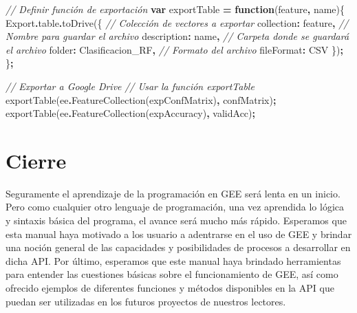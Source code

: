\documentclass[
  12pt,
  letterpaper,
  twoside]{book}
\newenvironment{Shaded}{\begin{snugshade}}{\end{snugshade}}
\newcommand{\AttributeTok}[1]{\textcolor[rgb]{0.77,0.63,0.00}{#1}}
\newcommand{\CommentTok}[1]{\textcolor[rgb]{0.56,0.35,0.01}{\textit{#1}}}
\newcommand{\DataTypeTok}[1]{\textcolor[rgb]{0.13,0.29,0.53}{#1}}
\newcommand{\FunctionTok}[1]{\textcolor[rgb]{0.00,0.00,0.00}{#1}}
\newcommand{\KeywordTok}[1]{\textcolor[rgb]{0.13,0.29,0.53}{\textbf{#1}}}
\newcommand{\NormalTok}[1]{#1}
\newcommand{\OperatorTok}[1]{\textcolor[rgb]{0.81,0.36,0.00}{\textbf{#1}}}
\newcommand{\StringTok}[1]{\textcolor[rgb]{0.31,0.60,0.02}{#1}}
\begin{document}
\begin{Shaded}
\begin{Highlighting}[]
\CommentTok{// Definir función de exportación}
\KeywordTok{var}\NormalTok{ exportTable }\OperatorTok{=} \KeywordTok{function}\NormalTok{(feature}\OperatorTok{,}\NormalTok{ name)\{}
\NormalTok{  Export}\OperatorTok{.}\AttributeTok{table}\OperatorTok{.}\FunctionTok{toDrive}\NormalTok{(\{}
    \CommentTok{// Colección de vectores a exportar}
    \DataTypeTok{collection}\OperatorTok{:}\NormalTok{ feature}\OperatorTok{,}
    \CommentTok{// Nombre para guardar el archivo}
    \DataTypeTok{description}\OperatorTok{:}\NormalTok{ name}\OperatorTok{,}
    \CommentTok{// Carpeta donde se guardará el archivo}
    \DataTypeTok{folder}\OperatorTok{:} \StringTok{\textquotesingle{}Clasificacion\_RF\textquotesingle{}}\OperatorTok{,}
    \CommentTok{// Formato del archivo}
    \DataTypeTok{fileFormat}\OperatorTok{:} \StringTok{\textquotesingle{}CSV\textquotesingle{}}
\NormalTok{ \})}\OperatorTok{;}
\NormalTok{\}}\OperatorTok{;}

\CommentTok{// Exportar a Google Drive}
\CommentTok{// Usar la función exportTable}
\FunctionTok{exportTable}\NormalTok{(ee}\OperatorTok{.}\FunctionTok{FeatureCollection}\NormalTok{(expConfMatrix)}\OperatorTok{,} \StringTok{\textquotesingle{}confMatrix\textquotesingle{}}\NormalTok{)}\OperatorTok{;}
\FunctionTok{exportTable}\NormalTok{(ee}\OperatorTok{.}\FunctionTok{FeatureCollection}\NormalTok{(expAccuracy)}\OperatorTok{,} \StringTok{\textquotesingle{}validAcc\textquotesingle{}}\NormalTok{)}\OperatorTok{;}
\end{Highlighting}
\end{Shaded}

\newpage

\hypertarget{cierre}{%
\chapter{Cierre}\label{cierre}}

Seguramente el aprendizaje de la programación en GEE será lenta en un inicio. Pero como cualquier otro lenguaje de programación, una vez aprendida lo lógica y sintaxis básica del programa, el avance será mucho más rápido. Esperamos que esta manual haya motivado a los usuario a adentrarse en el uso de GEE y brindar una noción general de las capacidades y posibilidades de procesos a desarrollar en dicha API. Por último, esperamos que este manual haya brindado herramientas para entender las cuestiones básicas sobre el funcionamiento de GEE, así como ofrecido ejemplos de diferentes funciones y métodos disponibles en la API que puedan ser utilizadas en los futuros proyectos de nuestros lectores.
\end{document}
